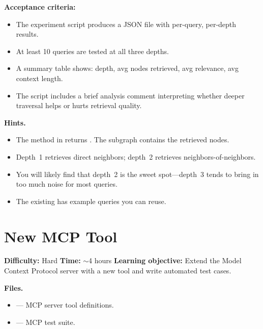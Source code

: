 \begin{tryit}
\textbf{Acceptance criteria:}
\begin{itemize}
    \item The experiment script produces a JSON file with per-query,
          per-depth results.
    \item At least 10 queries are tested at all three depths.
    \item A summary table shows: depth, avg nodes retrieved, avg
          relevance, avg context length.
    \item The script includes a brief analysis comment interpreting whether
          deeper traversal helps or hurts retrieval quality.
\end{itemize}
\end{tryit}

\medskip\noindent\textbf{Hints.}

\begin{itemize}
    \item The  method in 
          returns .  The subgraph
          contains the retrieved nodes.
    \item Depth~1 retrieves direct neighbors; depth~2 retrieves
          neighbors-of-neighbors.
    \item You will likely find that depth~2 is the sweet spot---depth~3
          tends to bring in too much noise for most queries.
    \item The existing  has example
          queries you can reuse.
\end{itemize}


\section{New MCP Tool}
\label{sec:ex-mcp-tool}

\noindent\textbf{Difficulty:} Hard \quad
\textbf{Time:} $\sim$4 hours \quad
\textbf{Learning objective:} Extend the Model Context Protocol server
with a new tool and write automated test cases.

\medskip\noindent\textbf{Files.}

\begin{itemize}
    \item {} --- MCP server tool definitions.
    \item {} --- MCP test suite.
\end{itemize}

